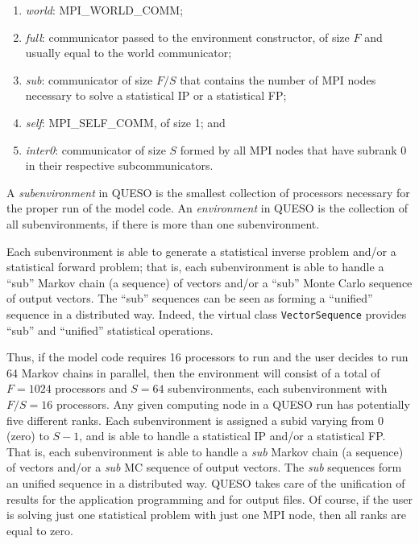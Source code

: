 \begin{enumerate}

\item {\it world}: MPI\_WORLD\_COMM;
\item {\it full}: communicator passed to the environment constructor, of size $F$ and usually equal to the world communicator;
\item {\it sub}: communicator of size $F/S$ that contains the number of MPI nodes necessary to solve a statistical IP or a statistical FP;
\item {\it self}: MPI\_SELF\_COMM, of size 1; and
\item {\it inter0}: communicator of size $S$ formed by all MPI nodes that have subrank 0 in their respective subcommunicators.

\end{enumerate}


A {\it subenvironment} in QUESO is the smallest collection of processors
necessary for the proper run of the model code.  An {\it environment} in QUESO
is the collection of all subenvironments, if there is more than one
subenvironment.


Each subenvironment is able to generate a statistical inverse problem and/or a
statistical forward problem; that is, each subenvironment is able to handle a
``sub'' Markov chain (a sequence) of vectors and/or a ``sub'' Monte Carlo
sequence of output vectors.  The ``sub'' sequences can be seen as forming a
``unified'' sequence in a distributed way.  Indeed, the virtual class
\verb+VectorSequence+ provides ``sub'' and ``unified'' statistical operations.

Thus, if the model code requires 16 processors to run and the user decides to run 64 Markov chains in parallel,
then the environment will consist of a total of $F=1024$ processors and $S=64$ subenvironments, each subenvironment with $F/S=16$ processors.
Any given computing node in a QUESO run has potentially five different ranks.
Each subenvironment is assigned a subid varying from $0$ (zero) to $S-1$, and is able to handle a statistical IP and/or a statistical FP.
That is, each subenvironment is able to handle a {\it sub} Markov chain (a sequence) of vectors and/or a {\it sub} MC sequence of output vectors.
The {\it sub} sequences form an unified sequence in a distributed way.
QUESO takes care of the unification of results for the application programming and for output files.  Of course, if the user is solving just one statistical problem with just one MPI node, then all ranks are equal to zero.

